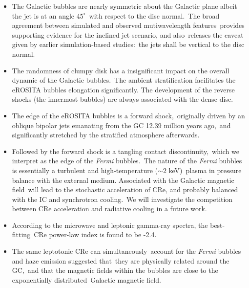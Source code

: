 \documentclass[twocolumn]{aastex631}
\begin{document}
\begin{itemize}

\item The Galactic bubbles are nearly symmetric about the Galactic plane albeit the jet is at an angle $45^{\circ}$\
      with respect to the disc normal.\
      The broad agreement between simulated and observed mutiwavelength features\
      provides supporting evidence for the inclined jet scenario, and also\
      releases the caveat given by earlier simulation-based studies:\
      the jets shall be vertical to the disc normal.
\item The randomness of clumpy disk has a insignificant impact on the overall dynamic of the Galactic bubbles.\
      The ambient stratification facilitates the eROSITA bubbles elongation significantly.
      The development of the reverse shocks (the innermost bubbles) are always associated with the dense disc.
\item The edge of the eROSITA bubbles is a forward shock,\
      originally driven by an oblique bipolar jets emanating from the GC 12.39 million years ago,\
      and significantly stretched by the stratified atmosphere afterwards.
\item Followed by the forward shock is a tangling contact discontinuity,\
      which we interpret as the edge of the \textit{Fermi} bubbles.\
      The nature of the \textit{Fermi} bubbles is essentially a turbulent and high-temperature ($\sim2$ keV)\
      plasma in pressure balance with the external medium. Associated with the Galactic magnetic field\
      will lead to the stochastic acceleration of CRe, and probably balanced with the IC and synchrotron cooling.\
      We will investigate the competition between CRe acceleration and radiative cooling in a future work.
\item According to the microwave and leptonic gamma-ray spectra, the best-fitting\
      CRe power-law index is found to be -2.4.
\item The same leptotonic CRe can simultaneously\
      account for the \textit{Fermi} bubbles and haze emission suggested that\
      they are physically related around the GC,\
      and that the magnetic fields within the bubbles are close to the exponentially distributed\
      Galactic magnetic field.
\end{itemize}



%
%
\end{document}
